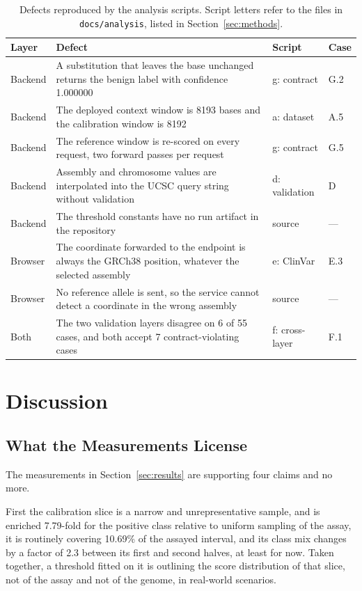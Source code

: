 \documentclass[10pt,journal]{IEEEtran}
\begin{document}
\begin{table}[!t]
\caption{Defects reproduced by the analysis scripts. Script letters refer to the files in \texttt{docs/analysis}, listed in Section~\ref{sec:methods}.}
\label{tab:defects}
\centering
\footnotesize
\begin{tabular}{@{}p{1.0cm}p{3.5cm}p{1.9cm}p{0.75cm}@{}}
\toprule
Layer & Defect & Script & Case \\
\midrule
Backend & A substitution that leaves the base unchanged returns the benign label with confidence 1.000000 & g: contract & G.2 \\
Backend & The deployed context window is 8193 bases and the calibration window is 8192 & a: dataset & A.5 \\
Backend & The reference window is re-scored on every request, two forward passes per request & g: contract & G.5 \\
Backend & Assembly and chromosome values are interpolated into the UCSC query string without validation & d: validation & D \\
Backend & The threshold constants have no run artifact in the repository & source & --- \\
Browser & The coordinate forwarded to the endpoint is always the GRCh38 position, whatever the selected assembly & e: ClinVar & E.3 \\
Browser & No reference allele is sent, so the service cannot detect a coordinate in the wrong assembly & source & --- \\
Both & The two validation layers disagree on 6 of 55 cases, and both accept 7 contract-violating cases & f: cross-layer & F.1 \\
\bottomrule
\end{tabular}
\end{table}

\section{Discussion}
\label{sec:discussion}

\subsection{What the Measurements License}
The measurements in Section~\ref{sec:results} are supporting four claims and no more.

First the calibration slice is a narrow and unrepresentative sample, and is enriched 7.79-fold for the positive class relative to uniform sampling of the assay, it is routinely covering 10.69\% of the assayed interval, and its class mix changes by a factor of 2.3 between its first and second halves, at least for now. Taken together, a threshold fitted on it is outlining the score distribution of that slice, not of the assay and not of the genome, in real-world scenarios.
\end{document}
